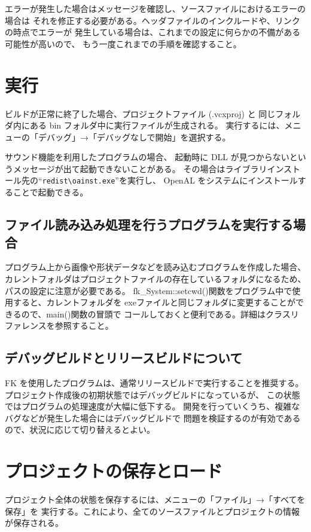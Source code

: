 \documentclass[a4j]{jarticle}
\begin{document}
エラーが発生した場合はメッセージを確認し、ソースファイルにおけるエラーの場合は
それを修正する必要がある。ヘッダファイルのインクルードや、リンクの時点でエラーが
発生している場合は、これまでの設定に何らかの不備がある可能性が高いので、
もう一度これまでの手順を確認すること。


\section{実行}
ビルドが正常に終了した場合、プロジェクトファイル (.vcxproj) と
同じフォルダ内にある bin フォルダ中に実行ファイルが生成される。
実行するには、メニューの「デバッグ」→「デバッグなしで開始」を選択する。

サウンド機能を利用したプログラムの場合、
起動時に DLL が見つからないというメッセージが出て起動できないことがある。
その場合はライブラリインストール先の``\verb+redist\oainst.exe+''を実行し、
OpenAL をシステムにインストールすることで起動できる。

\subsection{ファイル読み込み処理を行うプログラムを実行する場合}
プログラム上から画像や形状データなどを読み込むプログラムを作成した場合、
カレントフォルダはプロジェクトファイルの存在しているフォルダになるため、
パスの設定に注意が必要である。
fk\_System::setcwd()関数をプログラム中で使用すると、カレントフォルダを
exeファイルと同じフォルダに変更することができるので、main()関数の冒頭で
コールしておくと便利である。詳細はクラスリファレンスを参照すること。

\subsection{デバッグビルドとリリースビルドについて}
FK を使用したプログラムは、通常リリースビルドで実行することを推奨する。
プロジェクト作成後の初期状態ではデバッグビルドになっているが、
この状態ではプログラムの処理速度が大幅に低下する。
開発を行っていくうち、複雑なバグなどが発生した場合にはデバッグビルドで
問題を検証するのが有効であるので、状況に応じて切り替えるとよい。


\section{プロジェクトの保存とロード}
プロジェクト全体の状態を保存するには、メニューの「ファイル」→「すべてを保存」を
実行する。これにより、全てのソースファイルとプロジェクトの情報が保存される。
\end{document}
